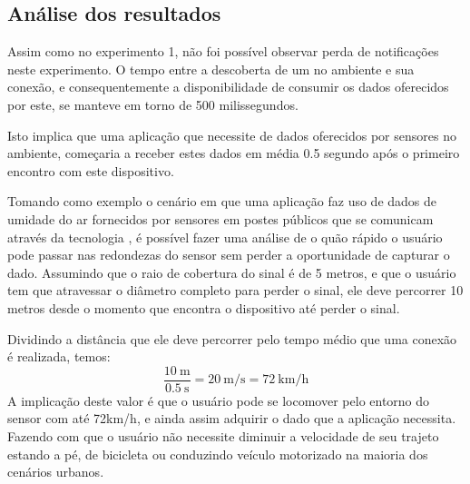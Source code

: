 \begin{table}[ht]
	\begin{center}
	\end{center}
\end{table}

\subsection{Análise dos resultados}

Assim como no experimento 1, não foi possível observar perda de notificações neste experimento.
O tempo entre a descoberta de um \smartobj no ambiente e sua conexão, e consequentemente a disponibilidade de consumir os dados oferecidos por este, se manteve em torno de 500 milissegundos.

Isto implica que uma aplicação que necessite de dados oferecidos por sensores no ambiente, começaria a receber estes dados em média 0.5 segundo após o primeiro encontro com este dispositivo.

Tomando como exemplo o cenário em que uma aplicação faz uso de dados de umidade do ar fornecidos por sensores em postes públicos que se comunicam através da tecnologia \ble, é possível fazer uma análise de o quão rápido o usuário pode passar nas redondezas do sensor sem perder a oportunidade de capturar o dado.
Assumindo que o raio de cobertura do sinal \bluetooth é de 5 metros, e que o usuário tem que atravessar o diâmetro completo para perder o sinal, ele deve percorrer 10 metros desde o momento que encontra o dispositivo até perder o sinal.

Dividindo a distância que ele deve percorrer pelo tempo médio que uma conexão é realizada, temos:
\[
	\frac{\qty{10}{\meter}}{\qty{0.5}{\second}} = \qty[per-mode=symbol]{20}{\meter\per\second} = \qty[per-mode=symbol]{72}{\kilo\meter\per\hour}
\]
A implicação deste valor é que o usuário pode se locomover pelo entorno do sensor com até 72\si{km/h}, e ainda assim adquirir o dado que a aplicação necessita. Fazendo com que o usuário não necessite diminuir a velocidade de seu trajeto estando a pé, de bicicleta ou conduzindo veículo motorizado na maioria dos cenários urbanos.

